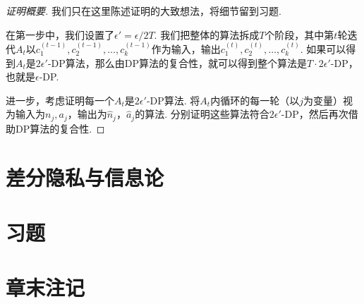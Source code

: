 \begin{proof}[证明概要]
我们只在这里陈述证明的大致想法，将细节留到习题.

在第一步中，我们设置了$\epsilon' = \epsilon / 2 T$. 我们把整体的算法拆成$T$个阶段，其中第$t$轮迭代$A_t$以$c_1^{(t-1)},c_2^{(t-1)},\dots,c_k^{(t-1)}$作为输入，输出$c_1^{(t)},c_2^{(t)},\dots,c_k^{(t)}$. 如果可以得到$A_t$是$2 \epsilon'$-DP算法，那么由DP算法的复合性，就可以得到整个算法是$T \cdot 2\epsilon'$-DP，也就是$\epsilon$-DP.

进一步，考虑证明每一个$A_t$是$2 \epsilon'$-DP算法. 将$A_t$内循环的每一轮（以$j$为变量）视为输入为$n_j,a_j$，输出为$\hat{n}_j$，$\hat{a}_j$的算法. 分别证明这些算法符合$2\epsilon'$-DP，然后再次借助DP算法的复合性.
\end{proof}

\section{差分隐私与信息论}

\section{习题}

\section{章末注记}